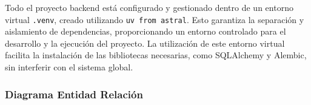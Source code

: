 Todo el proyecto backend está configurado y gestionado dentro de un entorno virtual \texttt{.venv}, creado utilizando \texttt{uv from astral}. Esto garantiza la separación y aislamiento de dependencias, proporcionando un entorno controlado para el desarrollo y la ejecución del proyecto. La utilización de este entorno virtual facilita la instalación de las bibliotecas necesarias, como SQLAlchemy y Alembic, sin interferir con el sistema global.

\subsubsection{Diagrama Entidad Relación}\label{sec:diagrama_ER}



